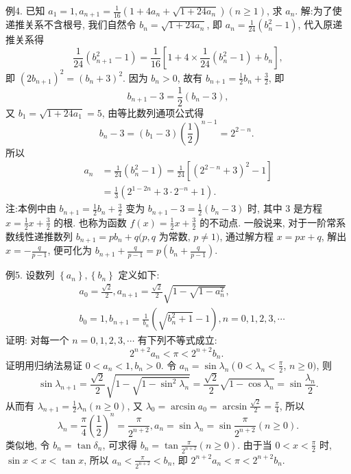 例4. 已知 $a_1=1, a_{n+1}=\frac{1}{16}\left(1+4 a_n+\sqrt{1+24 a_n}\right)(n \geqslant 1)$, 求 $a_n$.
解:为了使递推关系不含根号, 我们自然令 $b_n=\sqrt{1+24 a_n}$, 即 $a_n= \frac{1}{24}\left(b_n^2-1\right)$, 代入原递推关系得
$$
\frac{1}{24}\left(b_{n+1}^2-1\right)=\frac{1}{16}\left[1+4 \times \frac{1}{24}\left(b_n^2-1\right)+b_n\right],
$$
即 $\left(2 b_{n+1}\right)^2=\left(b_n+3\right)^2$. 因为 $b_n>0$, 故有 $b_{n+1}=\frac{1}{2} b_n+\frac{3}{2}$, 即
$$
b_{n+1}-3=\frac{1}{2}\left(b_n-3\right),
$$
又 $b_1=\sqrt{1+24 a_1}=5$, 由等比数列通项公式得
$$
b_n-3=\left(b_1-3\right)\left(\frac{1}{2}\right)^{n-1}=2^{2-n} \text {. }
$$
所以
$$
\begin{aligned}
a_n & =\frac{1}{24}\left(b_n^2-1\right)=\frac{1}{24}\left[\left(2^{2-n}+3\right)^2-1\right] \\
& =\frac{1}{3}\left(2^{1-2 n}+3 \cdot 2^{-n}+1\right) .
\end{aligned}
$$
注:本例中由 $b_{n+1}=\frac{1}{2} b_n+\frac{3}{2}$ 变为 $b_{n+1}-3=\frac{1}{2}\left(b_n-3\right)$ 时, 其中 3 是方程 $x=\frac{1}{2} x+\frac{3}{2}$ 的根.
也称为函数 $f(x)=\frac{1}{2} x+\frac{3}{2}$ 的不动点.
一般说来, 对于一阶常系数线性递推数列 $b_{n+1}=p b_n+q(p, q$ 为常数, $p \neq 1)$, 通过解方程 $x=p x+q$, 解出 $x=-\frac{q}{p-1}$, 便可化为 $b_{n+1}+\frac{q}{p-1}=p\left(b_n+\frac{q}{p-1}\right)$.



例5. 设数列 $\left\{a_n\right\},\left\{b_n\right\}$ 定义如下:
$$
\begin{aligned}
& a_0=\frac{\sqrt{2}}{2}, a_{n+1}=\frac{\sqrt{2}}{2} \sqrt{1-\sqrt{1-a_n^2}}, \\
& b_0=1, b_{n+1}=\frac{1}{b_n}\left(\sqrt{b_n^2+1}-1\right), n=0,1,2,3, \cdots
\end{aligned}
$$
证明: 对每一个 $n=0,1,2,3, \cdots$ 有下列不等式成立:
$$
2^{n+2} a_n<\pi<2^{n+2} b_n \text {. }
$$
证明用归纳法易证 $0<a_n<1, b_n>0$. 令 $a_n=\sin \lambda_n\left(0<\lambda_n<\frac{\pi}{2}\right.$, $n \geqslant 0)$, 则
$$
\sin \lambda_{n+1}=\frac{\sqrt{2}}{2} \sqrt{1-\sqrt{1-\sin ^2 \lambda_n}}=\frac{\sqrt{2}}{2} \sqrt{1-\cos \lambda_n}=\sin \frac{\lambda_n}{2} .
$$
从而有 $\lambda_{n+1}=\frac{1}{2} \lambda_n(n \geqslant 0)$, 又 $\lambda_0=\arcsin a_0=\arcsin \frac{\sqrt{2}}{2}=\frac{\pi}{4}$, 所以
$$
\lambda_n=\frac{\pi}{4}\left(\frac{1}{2}\right)^n=\frac{\pi}{2^{n+2}}, a_n=\sin \lambda_n=\sin \frac{\pi}{2^{n+2}}(n \geqslant 0) .
$$
类似地, 令 $b_n=\tan \delta_n$, 可求得 $b_n=\tan \frac{\pi}{2^{n+2}}(n \geqslant 0)$. 由于当 $0<x<\frac{\pi}{2}$ 时, $\sin x<x<\tan x$, 所以 $a_n<\frac{\pi}{2^{n+2}}<b_n$, 即 $2^{n+2} a_n<\pi<2^{n+2} b_n$.



